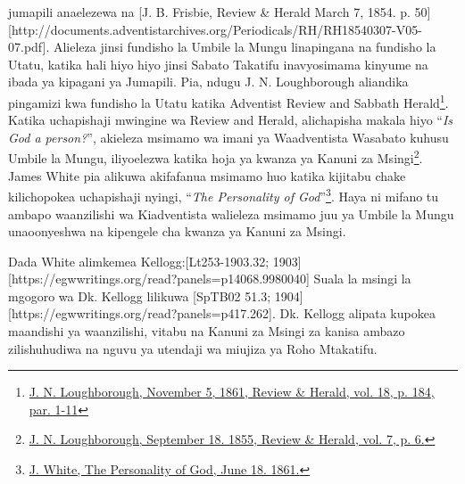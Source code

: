 jumapili anaelezewa na [J. B. Frisbie, Review \& Herald March 7, 1854. p. 50][http://documents.adventistarchives.org/Periodicals/RH/RH18540307-V05-07.pdf]. Alieleza jinsi fundisho la Umbile la Mungu linapingana na fundisho la Utatu, katika hali hiyo hiyo jinsi Sabato Takatifu inavyosimama kinyume na ibada ya kipagani ya Jumapili. Pia, ndugu J. N. Loughborough aliandika pingamizi kwa fundisho la Utatu katika Adventist Review and Sabbath Herald\footnote{\href{https://adventistdigitallibrary.org/adl-349160/advent-review-and-sabbath-herald-november-5-1861}{J. N. Loughborough, November 5, 1861, Review \& Herald, vol. 18, p. 184, par. 1-11}}. Katika uchapishaji mwingine wa Review and Herald, alichapisha makala hiyo “\textit{Is God a person?}”, akieleza msimamo wa imani ya Waadventista Wasabato kuhusu Umbile la Mungu, iliyoelezwa katika hoja ya kwanza ya Kanuni za Msingi\footnote{\href{http://documents.adventistarchives.org/Periodicals/RH/RH18550918-V07-06.pdf}{J. N. Loughborough, September 18. 1855, Review \& Herald, vol. 7, p. 6.}}. James White pia alikuwa akifafanua msimamo huo katika kijitabu chake kilichopokea uchapishaji nyingi, “\textit{The Personality of God}”\footnote{\href{https://egwwritings.org/?ref=en_PERGO.1.1&para=1471.3}{J. White, The Personality of God, June 18. 1861.}}. Haya ni mifano tu ambapo waanzilishi wa Kiadventista walieleza msimamo juu ya Umbile la Mungu unaoonyeshwa na kipengele cha kwanza ya Kanuni za Msingi.

Dada White alimkemea Kellogg:[Lt253-1903.32; 1903][https://egwwritings.org/read?panels=p14068.9980040] Suala la msingi la mgogoro wa Dk. Kellogg lilikuwa [SpTB02 51.3; 1904][https://egwwritings.org/read?panels=p417.262]. Dk. Kellogg alipata kupokea maandishi ya waanzilishi, vitabu na Kanuni za Msingi za kanisa ambazo zilishuhudiwa na nguvu ya utendaji wa miujiza ya Roho Mtakatifu.

